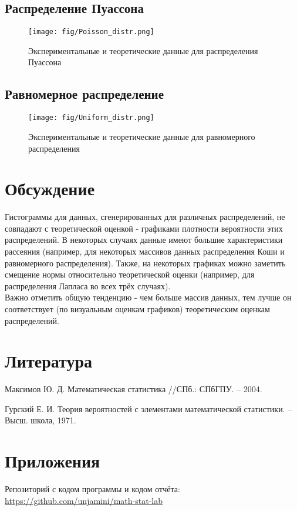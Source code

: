 \subsection{Распределение Пуассона}
\begin{figure}[H]
	\begin{center}
		\texttt{[image: fig/Poisson\_distr.png]}
		\caption{Экспериментальные и теоретические данные для распределения Пуассона} 
		\label{pic:pic_name} %
	\end{center}
\end{figure}

\subsection{Равномерное распределение}


\begin{figure}[H]
	\begin{center}
		\texttt{[image: fig/Uniform\_distr.png]}
		\caption{Экспериментальные и теоретические данные для равномерного распределения} 
		\label{pic:pic_name}
	\end{center}
\end{figure}


\section{Обсуждение}
Гистограммы для данных, сгенерированных для различных распределений, не совпадают с теоретической оценкой - графиками плотности вероятности этих распределений. В некоторых случаях данные имеют большие характеристики рассеяния (например, для некоторых массивов данных распределения Коши и равномерного распределения). Также, на некоторых графиках можно заметить смещение нормы относительно теоретической оценки (например, для распределения Лапласа во всех трёх случаях). 
\\
Важно отметить общую тенденцию - чем больше массив данных, тем лучше он соответствует (по визуальным оценкам графиков) теоретическим оценкам распределений.




\section{Литература}
Максимов Ю. Д. Математическая статистика //СПб.: СПбГПУ. – 2004.

Гурский Е. И. Теория вероятностей с элементами математической статистики. – Высш. школа, 1971.

\section{Приложения}

Репозиторий с кодом программы и кодом отчёта: \href{https://github.com/unjamini/math-stat-lab}{https://github.com/unjamini/math-stat-lab}



